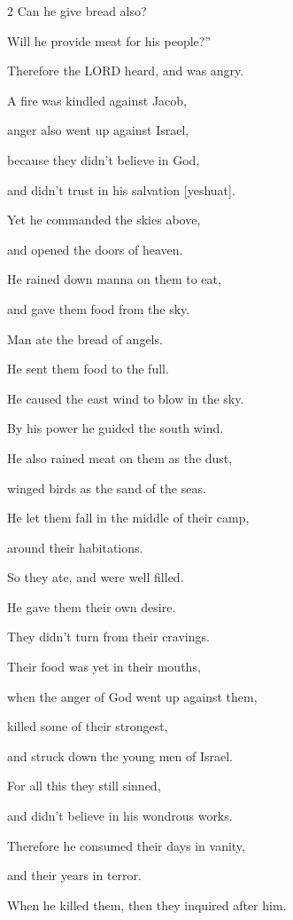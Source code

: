 \begin{multicols}{2}
	Can he give bread also?
	
	Will he provide meat for his people?”
	
	
	\myverse{}Therefore the LORD heard, and was angry.
	
	A fire was kindled against Jacob,
	
	anger also went up against Israel,
	
	
	\myverse{}because they didn’t believe in God,
	
	and didn’t trust in his salvation [yeshuat].
	
	
	\myverse{}Yet he commanded the skies above,
	
	and opened the doors of heaven.
	
	
	\myverse{}He rained down manna on them to eat,
	
	and gave them food from the sky.
	
	
	\myverse{}Man ate the bread of angels.
	
	He sent them food to the full.
	
	
	\myverse{}He caused the east wind to blow in the sky.
	
	By his power he guided the south wind.
	
	
	\myverse{}He also rained meat on them as the dust,
	
	winged birds as the sand of the seas.
	
	
	\myverse{}He let them fall in the middle of their camp,
	
	around their habitations.
	
	
	\myverse{}So they ate, and were well filled.
	
	He gave them their own desire.
	
	
	\myverse{}They didn’t turn from their cravings.
	
	Their food was yet in their mouths,
	
	
	\myverse{}when the anger of God went up against them,
	
	killed some of their strongest,
	
	and struck down the young men of Israel.
	
	
	\myverse{}For all this they still sinned,
	
	and didn’t believe in his wondrous works.
	
	
	\myverse{}Therefore he consumed their days in vanity,
	
	and their years in terror.
	
	
	\myverse{}When he killed them, then they inquired after him.
	

\end{multicols}
